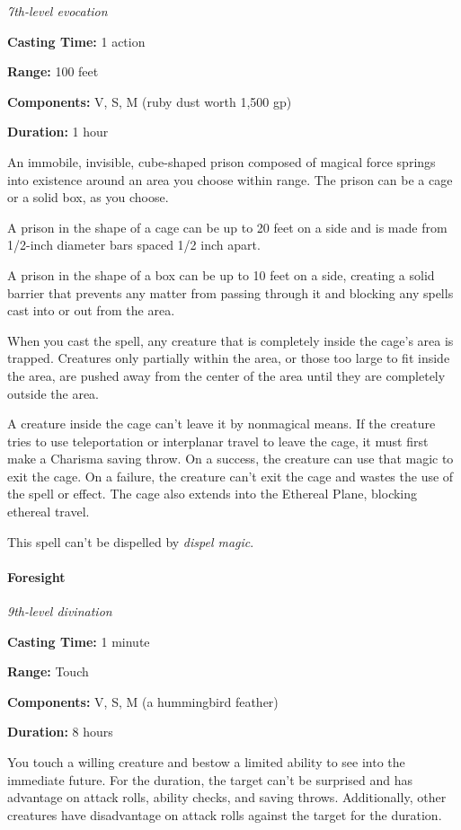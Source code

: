 \documentclass[
]{article}
\begin{document}
\emph{7th-level evocation}

\textbf{Casting Time:} 1 action

\textbf{Range:} 100 feet

\textbf{Components:} V, S, M (ruby dust worth 1,500 gp)

\textbf{Duration:} 1 hour

An immobile, invisible, cube-shaped prison composed of magical force
springs into existence around an area you choose within range. The
prison can be a cage or a solid box, as you choose.

A prison in the shape of a cage can be up to 20 feet on a side and is
made from 1/2-inch diameter bars spaced 1/2 inch apart.

A prison in the shape of a box can be up to 10 feet on a side, creating
a solid barrier that prevents any matter from passing through it and
blocking any spells cast into or out from the area.

When you cast the spell, any creature that is completely inside the
cage's area is trapped. Creatures only partially within the area, or
those too large to fit inside the area, are pushed away from the center
of the area until they are completely outside the area.

A creature inside the cage can't leave it by nonmagical means. If the
creature tries to use teleportation or interplanar travel to leave the
cage, it must first make a Charisma saving throw. On a success, the
creature can use that magic to exit the cage. On a failure, the creature
can't exit the cage and wastes the use of the spell or effect. The cage
also extends into the Ethereal Plane, blocking ethereal travel.

This spell can't be dispelled by \emph{dispel magic}.

\hypertarget{foresight}{%
\paragraph{Foresight}\label{foresight}}

\emph{9th-level divination}

\textbf{Casting Time:} 1 minute

\textbf{Range:} Touch

\textbf{Components:} V, S, M (a hummingbird feather)

\textbf{Duration:} 8 hours

You touch a willing creature and bestow a limited ability to see into
the immediate future. For the duration, the target can't be surprised
and has advantage on attack rolls, ability checks, and saving throws.
Additionally, other creatures have disadvantage on attack rolls against
the target for the duration.
\end{document}
